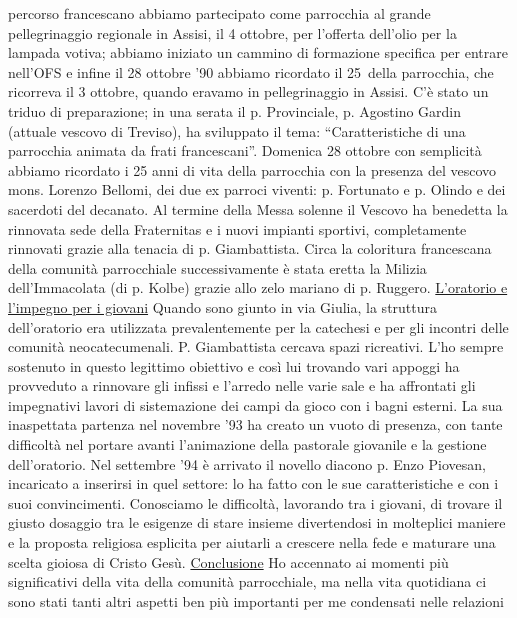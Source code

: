 percorso francescano abbiamo partecipato come parrocchia al grande pellegrinaggio regionale in 
Assisi, il 4 ottobre, per l'offerta dell'olio per la lampada votiva; abbiamo iniziato un cammino di 
formazione specifica per entrare nell'OFS e infine il 28 ottobre '90 abbiamo ricordato il 25\textdegree\ della 
parrocchia, che ricorreva il 3 ottobre, quando eravamo in pellegrinaggio in Assisi. 
C'è stato un triduo di preparazione; in una serata il p. Provinciale, p. Agostino Gardin 
(attuale vescovo di Treviso), ha sviluppato il tema: “Caratteristiche di una parrocchia animata da 
frati francescani”. 
Domenica 28 ottobre con semplicità abbiamo ricordato i 25 anni di vita della parrocchia con la 
presenza del vescovo mons. Lorenzo Bellomi, dei due ex parroci viventi: p. Fortunato e p. Olindo e 
dei sacerdoti del decanato. Al termine della Messa solenne il Vescovo ha benedetta la rinnovata 
sede della Fraternitas e i nuovi impianti sportivi, completamente rinnovati grazie alla tenacia di p. 
Giambattista. 
Circa la coloritura francescana della comunità parrocchiale successivamente è stata eretta la 
Milizia dell’Immacolata (di p. Kolbe) grazie allo zelo mariano di p. Ruggero. 
\bigbreak
\underline{L'oratorio e l'impegno per i giovani}
\medbreak
Quando sono giunto in via Giulia, la struttura dell'oratorio era utilizzata prevalentemente per 
la catechesi e per gli incontri delle comunità neocatecumenali. P. Giambattista cercava spazi 
ricreativi. L'ho sempre sostenuto in questo legittimo obiettivo e così lui trovando vari appoggi ha 
provveduto a rinnovare gli infissi e l'arredo nelle varie sale e ha affrontati gli impegnativi lavori di 
sistemazione dei campi da gioco con i bagni esterni.
La sua inaspettata partenza nel novembre '93 ha creato un vuoto di presenza, con tante 
difficoltà nel portare avanti l'animazione della pastorale giovanile e la gestione dell'oratorio.
Nel settembre '94 è arrivato il novello diacono p. Enzo Piovesan, incaricato a inserirsi in quel 
settore: lo ha fatto con le sue caratteristiche e con i suoi convincimenti. Conosciamo le difficoltà, 
lavorando tra i giovani, di trovare il giusto dosaggio tra le esigenze di stare insieme divertendosi in 
molteplici maniere e la proposta religiosa esplicita per aiutarli a crescere nella fede e maturare una 
scelta gioiosa di Cristo Gesù.
\bigbreak
{}
\underline{Conclusione}
\medbreak
Ho accennato ai momenti più significativi della vita della comunità parrocchiale, ma nella 
vita quotidiana ci sono stati tanti altri aspetti ben più importanti per me condensati nelle relazioni 
